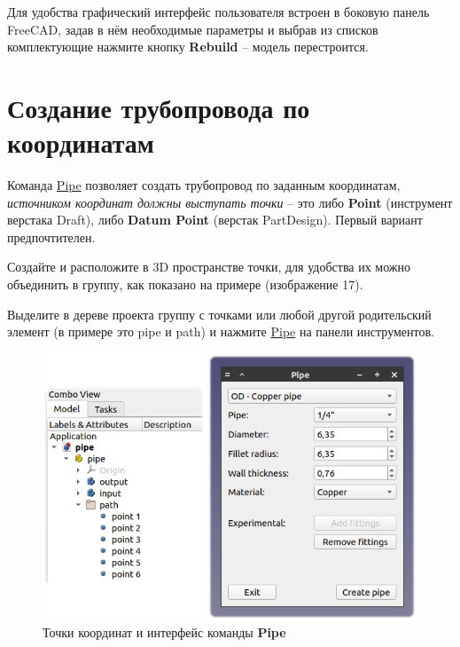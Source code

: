 \documentclass[a4paper,12pt]{article}
\begin{document}
Для удобства графический интерфейс пользователя встроен в боковую панель FreeCAD, задав в нём необходимые параметры и выбрав из списков комплектующие нажмите кнопку \textbf{Rebuild} -- модель перестроится.

\pagebreak


\section{Создание трубопровода по координатам}

Команда \hyperref[sec:9]{Pipe} позволяет создать трубопровод по заданным координатам,
\emph{источником координат должны выступать точки} -- это либо \textbf{Point} (инструмент верстака Draft), либо \textbf{Datum Point} (верстак PartDesign). Первый вариант предпочтителен.

Создайте и расположите в 3D пространстве точки, для удобства их можно объединить в группу, как показано на примере (изображение 17).

Выделите в дереве проекта группу с точками или любой другой родительский элемент (в примере это pipe и path) и нажмите \hyperref[sec:9]{Pipe} на панели инструментов.

\begin{figure}[htp]
	\centering
	\includegraphics[scale=1]{img/pipe.png}
	\caption{Точки координат и интерфейс команды \textbf{Pipe}}
	\label{sec:pipe}
\end{figure}
\end{document}
